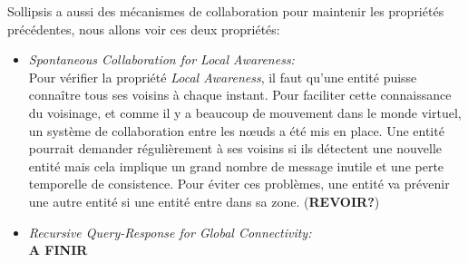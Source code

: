 Sollipsis a aussi des mécanismes de collaboration pour maintenir les propriétés précédentes, nous allons voir ces deux propriétés:
	\begin{itemize}
		\item \textit{Spontaneous Collaboration for Local Awareness:}\\
		Pour vérifier la propriété \textit{Local Awareness}, il faut qu'une entité puisse connaître tous ses voisins à chaque instant. Pour faciliter cette connaissance du voisinage, et comme il y a beaucoup de mouvement dans le monde virtuel, un système de collaboration entre les nœuds a été mis en place. Une entité pourrait demander régulièrement à ses voisins si ils détectent une nouvelle entité mais cela implique un grand nombre de message inutile et une perte temporelle de consistence. Pour éviter ces problèmes, une entité va prévenir une autre entité si une entité entre dans sa zone. (\textbf{REVOIR?}) 
		\item \textit{Recursive Query-Response for Global Connectivity:}\\
		\textbf{A FINIR}
	\end{itemize}

